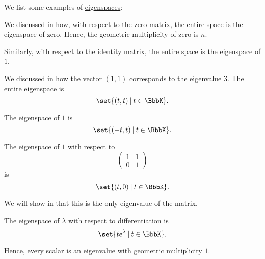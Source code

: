 \begin{example}\label{ex:def:eigenspace}
  We list some examples of \hyperref[def:eigenspace]{eigenspaces}:
  \begin{thmenum}
     We discussed in  how, with respect to the zero matrix, the entire space is the eigenspace of zero. Hence, the geometric multiplicity of zero is \( n \).

     Similarly, with respect to the identity matrix, the entire space is the eigenspace of \( 1 \).

     We discussed in  how the vector \( (1, 1) \) corresponds to the eigenvalue \( 3 \). The entire eigenspace is
    \begin{equation*}
      \set{ (t, t) \given t \in \BbbK }.
    \end{equation*}

    The eigenspace of \( 1 \) is
    \begin{equation*}
      \set{ (-t, t) \given t \in \BbbK }.
    \end{equation*}

     The eigenspace of \( 1 \) with respect to
    \begin{equation*}
      \begin{pmatrix}
        1 & 1 \\
        0 & 1
      \end{pmatrix}
    \end{equation*}
    is
    \begin{equation*}
      \set{ (t, 0) \given t \in \BbbK }.
    \end{equation*}

    We will show in  that this is the only eigenvalue of the matrix.

     The eigenspace of \( \lambda \) with respect to differentiation is
    \begin{equation*}
      \set{ t e^\lambda \given t \in \BbbK }.
    \end{equation*}

    Hence, every scalar is an eigenvalue with geometric multiplicity \( 1 \).
  \end{thmenum}
\end{example}

